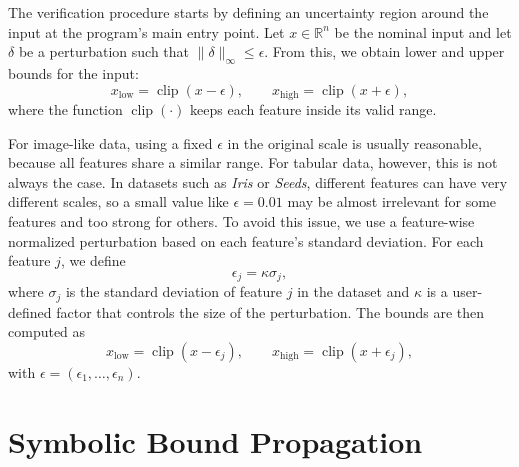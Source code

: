 The verification procedure starts by defining an uncertainty region around the input at the program's main entry point. Let $x \in \mathbb{R}^n$ be the nominal input and let $\delta$ be a perturbation such that $\lVert \delta \rVert_\infty \leq \epsilon$. From this, we obtain lower and upper bounds for the input:
\begin{equation}
    x_{\text{low}} = \operatorname{clip}(x - \epsilon),
    \qquad
    x_{\text{high}} = \operatorname{clip}(x + \epsilon),
\end{equation}
where the function $\operatorname{clip}(\cdot)$ keeps each feature inside its valid range.

For image-like data, using a fixed $\epsilon$ in the original scale is usually reasonable, because all features share a similar range. For tabular data, however, this is not always the case. In datasets such as \textit{Iris} or \textit{Seeds}, different features can have very different scales, so a small value like $\epsilon = 0.01$ may be almost irrelevant for some features and too strong for others. To avoid this issue, we use a feature-wise normalized perturbation based on each feature's standard deviation. For each feature $j$, we define
\begin{equation}
    \epsilon_j = \kappa \sigma_j,
\end{equation}
where $\sigma_j$ is the standard deviation of feature $j$ in the dataset and $\kappa$ is a user-defined factor that controls the size of the perturbation. The bounds are then computed as
\begin{equation}
    x_{\text{low}} = \operatorname{clip}(x - \epsilon_j),
    \qquad
    x_{\text{high}} = \operatorname{clip}(x + \epsilon_j),
\end{equation}
with $\epsilon = (\epsilon_1, \dots, \epsilon_n)$.

\section{Symbolic Bound Propagation}

